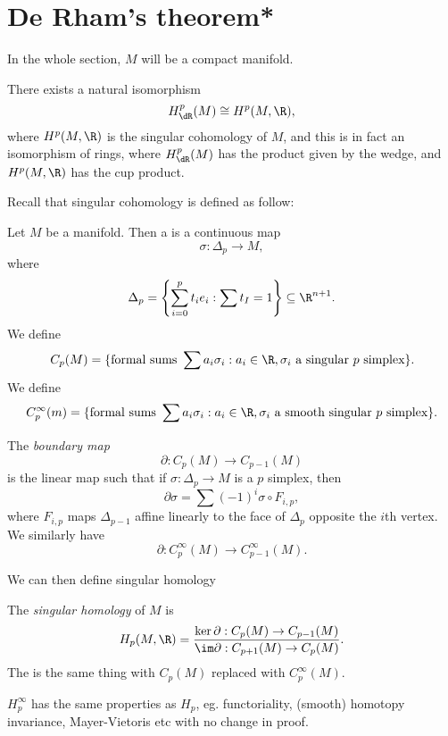 \documentclass[a4paper]{article}
\begin{document}
\section{De Rham's theorem*}
In the whole section, $M$ will be a compact manifold.

\begin{thm}
  There exists a natural isomorphism
  \[
    H^p_{\dR}(M) \cong H^p(M, \R),
  \]
  where $H^p(M, \R)$ is the singular cohomology of $M$, and this is in fact an isomorphism of rings, where $H^p_{\dR}(M)$ has the product given by the wedge, and $H^p(M, \R)$ has the cup product.
\end{thm}

Recall that singular cohomology is defined as follow:
\begin{defi}
  Let $M$ be a manifold. Then a  is a continuous map
  \[
    \sigma: \Delta_p \to M,
  \]
  where
  \[
    \Delta_p = \left\{\sum_{i = 0}^p t_i e_i: \sum t_I = 1\right\} \subseteq \R^{n + 1}.
  \]
  We define
  \[
    C_p(M) = \{\text{formal sums }\sum a_i \sigma_i: a_i \in \R, \sigma_i\text{ a singular $p$ simplex}\}.
  \]
  We define
  \[
    C_p^\infty(m) = \{\text{formal sums }\sum a_i \sigma_i: a_i \in \R, \sigma_i\text{ a smooth singular $p$ simplex}\}.
  \]
\end{defi}

\begin{defi}
  The \emph{boundary map}
  \[
    \partial: C_p(M) \to C_{p - 1}(M)
  \]
  is the linear map such that if $\sigma: \Delta_p \to M$ is a $p$ simplex, then
  \[
    \partial \sigma = \sum (-1)^i \sigma \circ F_{i, p},
  \]
  where $F_{i, p}$ maps $\Delta_{p - 1}$ affine linearly to the face of $\Delta_p$ opposite the $i$th vertex. We similarly have
  \[
    \partial: C_p^\infty(M) \to C_{p - 1}^\infty(M).
  \]
\end{defi}

We can then define singular homology
\begin{defi}
  The \emph{singular homology} of $M$ is
  \[
    H_p(M, \R) = \frac{\ker \partial: C_p(M) \to C_{p - 1}(M)}{\im \partial: C_{p + 1}(M) \to C_p(M)}.
  \]
  The  is the same thing with $C_p(M)$ replaced with $C_p^\infty(M)$.
\end{defi}

$H_p^\infty$ has the same properties as $H_p$, eg. functoriality, (smooth) homotopy invariance, Mayer-Vietoris etc with no change in proof.
\end{document}
